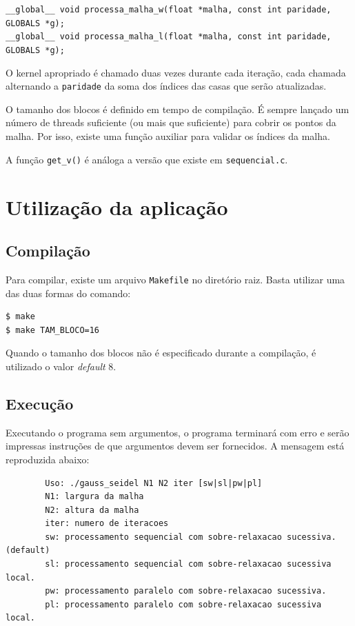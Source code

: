 \documentclass[a4paper,landscape,11pt]{article}
\begin{document}
\texttt{\_\_global\_\_ void processa\_malha\_w(float *malha, const int paridade, GLOBALS *g); \\
\_\_global\_\_ void processa\_malha\_l(float *malha, const int paridade, GLOBALS *g);}

O kernel apropriado é chamado duas vezes durante cada iteração, cada chamada alternando a \texttt{paridade} da soma dos índices das casas que serão atualizadas.

O tamanho dos blocos é definido em tempo de compilação. É sempre lançado um número de threads suficiente (ou mais que suficiente) para cobrir os pontos da malha. Por isso, existe uma função auxiliar para validar os índices da malha.

A função \texttt{get\_v()} é análoga a versão que existe em \texttt{sequencial.c}.

\newpage
\section{Utilização da aplicação}

\subsection{Compilação}
Para compilar, existe um arquivo \texttt{Makefile} no diretório raiz. Basta utilizar uma das duas formas do comando:
\begin{verbatim}
$ make
$ make TAM_BLOCO=16
\end{verbatim}

Quando o tamanho dos blocos não é especificado durante a compilação, é utilizado o valor \textit{default} 8.

\subsection{Execução}

Executando o programa sem argumentos, o programa terminará com erro e serão impressas instruções de que argumentos devem ser fornecidos. A mensagem está reproduzida abaixo:

\begin{verbatim}
        Uso: ./gauss_seidel N1 N2 iter [sw|sl|pw|pl]
        N1: largura da malha
        N2: altura da malha
        iter: numero de iteracoes
        sw: processamento sequencial com sobre-relaxacao sucessiva. (default)
        sl: processamento sequencial com sobre-relaxacao sucessiva local.
        pw: processamento paralelo com sobre-relaxacao sucessiva.
        pl: processamento paralelo com sobre-relaxacao sucessiva local.
\end{verbatim}
\end{document}
